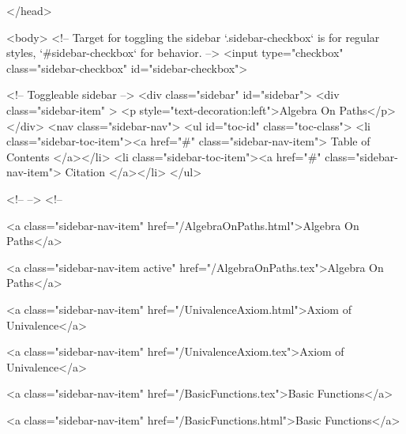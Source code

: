   
</head>




  <body>
    <!-- Target for toggling the sidebar `.sidebar-checkbox` is for regular
     styles, `#sidebar-checkbox` for behavior. -->
<input type="checkbox" class="sidebar-checkbox" id="sidebar-checkbox">

<!-- Toggleable sidebar -->
<div class="sidebar" id="sidebar">
  <div class="sidebar-item" >
    <p style="text-decoration:left">Algebra On Paths</p>
  </div>
  <nav class="sidebar-nav">
    <ul id="toc-id" class="toc-class">
  <li class="sidebar-toc-item"><a href="#" class="sidebar-nav-item"> Table of Contents </a></li>
  <li class="sidebar-toc-item"><a href="#" class="sidebar-nav-item"> Citation </a></li>
</ul>


    <!--  -->
    <!-- 
      
    
      
    
      
    
      
        
      
    
      
        
          <a class="sidebar-nav-item" href="/AlgebraOnPaths.html">Algebra On Paths</a>
        
      
    
      
        
          <a class="sidebar-nav-item active" href="/AlgebraOnPaths.tex">Algebra On Paths</a>
        
      
    
      
        
          <a class="sidebar-nav-item" href="/UnivalenceAxiom.html">Axiom of Univalence</a>
        
      
    
      
        
          <a class="sidebar-nav-item" href="/UnivalenceAxiom.tex">Axiom of Univalence</a>
        
      
    
      
        
          <a class="sidebar-nav-item" href="/BasicFunctions.tex">Basic Functions</a>
        
      
    
      
        
          <a class="sidebar-nav-item" href="/BasicFunctions.html">Basic Functions</a>
        
      
    
      
        
